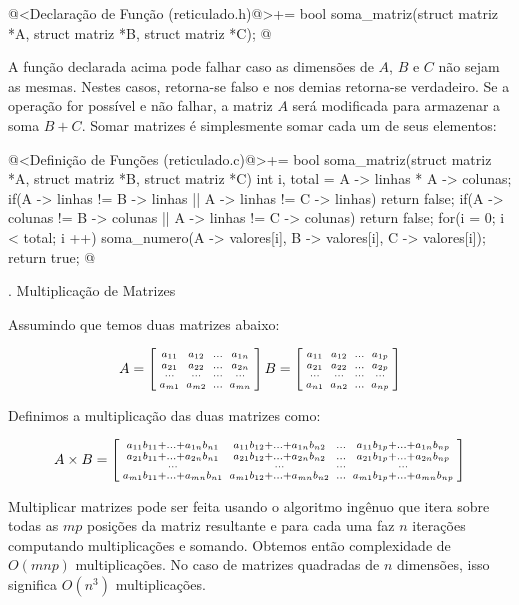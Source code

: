 \iniciocodigo
@<Declaração de Função (reticulado.h)@>+=
bool soma_matriz(struct matriz *A, struct matriz *B, struct matriz *C);
@
\fimcodigo

A função declarada acima pode falhar caso as dimensões de $A$, $B$ e
$C$ não sejam as mesmas. Nestes casos, retorna-se falso e nos demias
retorna-se verdadeiro. Se a operação for possível e não falhar, a
matriz $A$ será modificada para armazenar a soma $B+C$. Somar matrizes
é simplesmente somar cada um de seus elementos:

\iniciocodigo
@<Definição de Funções (reticulado.c)@>+=
bool soma_matriz(struct matriz *A, struct matriz *B, struct matriz *C){
  int i, total = A -> linhas * A -> colunas;
  if(A -> linhas != B -> linhas || A -> linhas != C -> linhas)
    return false;
  if(A -> colunas != B -> colunas || A -> linhas != C -> colunas)
    return false;
  for(i = 0; i < total; i ++)
    soma_numero(A -> valores[i], B -> valores[i], C -> valores[i]);
  return true;
}
@
\fimcodigo

{\tenbold{}. Multiplicação de Matrizes}

Assumindo que temos duas matrizes abaixo:

$$
A=\left[{{a_{11}\atop a_{21}}\atop{\ldots\atop a_{m1}}}
{{a_{12}\atop a_{22}}\atop{\ldots\atop a_{m2}}}
{{\ldots\atop \ldots}\atop{\ldots\atop \ldots}}
{{a_{1n}\atop a_{2n}}\atop{\ldots\atop a_{mn}}}
\right]
B=\left[{{a_{11}\atop a_{21}}\atop{\ldots\atop a_{n1}}}
{{a_{12}\atop a_{22}}\atop{\ldots\atop a_{n2}}}
{{\ldots\atop \ldots}\atop{\ldots\atop \ldots}}
{{a_{1p}\atop a_{2p}}\atop{\ldots\atop a_{np}}}
\right]
$$

Definimos a multiplicação das duas matrizes como:

$$
A\times B = \left[{{a_{11}b_{11}+\ldots+a_{1n}b_{n1}\atop
a_{21}b_{11}+\ldots+a_{2n}b_{n1}}\atop{\ldots\atop
a_{m1}b_{11}+\ldots+a_{mn}b_{n1}}}
{{a_{11}b_{12}+\ldots+a_{1n}b_{n2}\atop
a_{21}b_{12}+\ldots+a_{2n}b_{n2}}\atop{\ldots\atop
a_{m1}b_{12}+\ldots+a_{mn}b_{n2}}}
{{\ldots\atop \ldots}\atop{\ldots\atop \ldots}}
{{a_{11}b_{1p}+\ldots+a_{1n}b_{np}\atop
a_{21}b_{1p}+\ldots+a_{2n}b_{np}}\atop{\ldots\atop
a_{m1}b_{1p}+\ldots+a_{mn}b_{np}}}
\right]
$$

Multiplicar matrizes pode ser feita usando o algoritmo ingênuo que
itera sobre todas as $mp$ posições da matriz resultante e para cada
uma faz $n$ iterações computando multiplicações e somando. Obtemos
então complexidade de $O(mnp)$ multiplicações. No caso de matrizes
quadradas de $n$ dimensões, isso significa $O(n^3)$ multiplicações.

